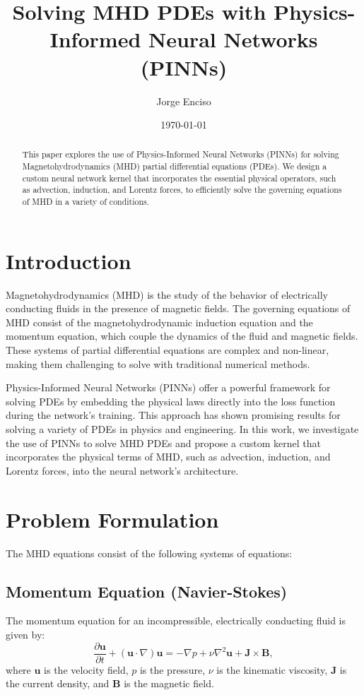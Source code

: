 \documentclass[12pt]{article}
\title{Solving MHD PDEs with Physics-Informed Neural Networks (PINNs)}
\author{Jorge Enciso}
\date{\today}
\begin{document}
\maketitle

\begin{abstract}
This paper explores the use of Physics-Informed Neural Networks (PINNs) for solving Magnetohydrodynamics (MHD) partial differential equations (PDEs). We design a custom neural network kernel that incorporates the essential physical operators, such as advection, induction, and Lorentz forces, to efficiently solve the governing equations of MHD in a variety of conditions.
\end{abstract}

\tableofcontents
\newpage

\section{Introduction}
Magnetohydrodynamics (MHD) is the study of the behavior of electrically conducting fluids in the presence of magnetic fields. The governing equations of MHD consist of the magnetohydrodynamic induction equation and the momentum equation, which couple the dynamics of the fluid and magnetic fields. These systems of partial differential equations are complex and non-linear, making them challenging to solve with traditional numerical methods.

Physics-Informed Neural Networks (PINNs) offer a powerful framework for solving PDEs by embedding the physical laws directly into the loss function during the network's training. This approach has shown promising results for solving a variety of PDEs in physics and engineering. In this work, we investigate the use of PINNs to solve MHD PDEs and propose a custom kernel that incorporates the physical terms of MHD, such as advection, induction, and Lorentz forces, into the neural network's architecture.

\section{Problem Formulation}
The MHD equations consist of the following systems of equations:

\subsection{Momentum Equation (Navier-Stokes)}
The momentum equation for an incompressible, electrically conducting fluid is given by:
\begin{equation}
\frac{\partial \mathbf{u}}{\partial t} + (\mathbf{u} \cdot \nabla) \mathbf{u} = -\nabla p + \nu \nabla^2 \mathbf{u} + \mathbf{J} \times \mathbf{B},
\end{equation}
where \( \mathbf{u} \) is the velocity field, \( p \) is the pressure, \( \nu \) is the kinematic viscosity, \( \mathbf{J} \) is the current density, and \( \mathbf{B} \) is the magnetic field.
\end{document}
